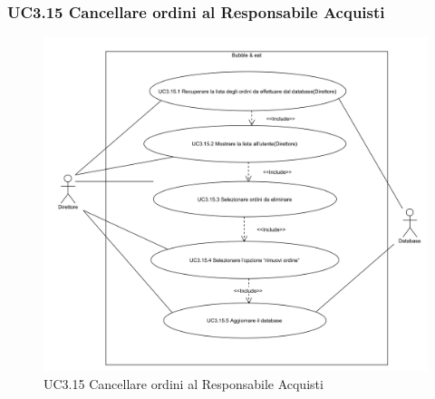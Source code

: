 \subsubsection{UC3.15 Cancellare ordini al Responsabile Acquisti} \label{UC3.15}

\begin{figure}[H]
	\centering
	\includegraphics[width=15cm]{../../documenti/AnalisiDeiRequisiti/Diagrammi_img/uc3_15.png}
	\caption{UC3.15 Cancellare ordini al Responsabile Acquisti}
\end{figure}

